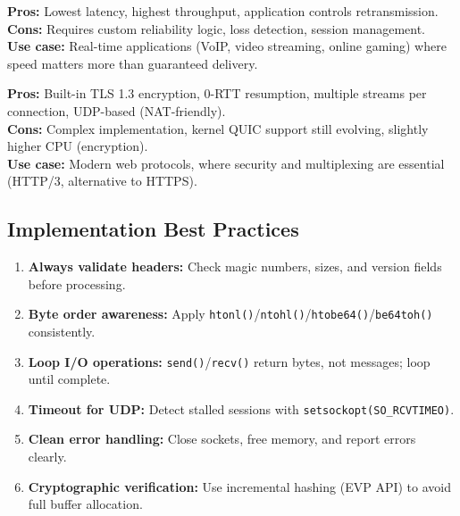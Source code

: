 \documentclass[12pt,a4paper]{article}
\begin{document}
\begin{tcolorbox}[colback=udporange!5,colframe=udporange,title=UDP: Speed and Control]
\textbf{Pros:} Lowest latency, highest throughput, application controls retransmission.\\
\textbf{Cons:} Requires custom reliability logic, loss detection, session management.\\
\textbf{Use case:} Real-time applications (VoIP, video streaming, online gaming) where speed matters more than guaranteed delivery.
\end{tcolorbox}

\begin{tcolorbox}[colback=quicgreen!5,colframe=quicgreen,title=QUIC: Security and Multiplex]
\textbf{Pros:} Built-in TLS 1.3 encryption, 0-RTT resumption, multiple streams per connection, UDP-based (NAT-friendly).\\
\textbf{Cons:} Complex implementation, kernel QUIC support still evolving, slightly higher CPU (encryption).\\
\textbf{Use case:} Modern web protocols, where security and multiplexing are essential (HTTP/3, alternative to HTTPS).
\end{tcolorbox}

\subsection{Implementation Best Practices}

\begin{enumerate}
  \item \textbf{Always validate headers:} Check magic numbers, sizes, and version fields before processing.
  \item \textbf{Byte order awareness:} Apply \texttt{htonl()}/\texttt{ntohl()}/\texttt{htobe64()}/\texttt{be64toh()} consistently.
  \item \textbf{Loop I/O operations:} \texttt{send()}/\texttt{recv()} return bytes, not messages; loop until complete.
  \item \textbf{Timeout for UDP:} Detect stalled sessions with \texttt{setsockopt(SO\_RCVTIMEO)}.
  \item \textbf{Clean error handling:} Close sockets, free memory, and report errors clearly.
  \item \textbf{Cryptographic verification:} Use incremental hashing (EVP API) to avoid full buffer allocation.
\end{enumerate}

\end{document}
